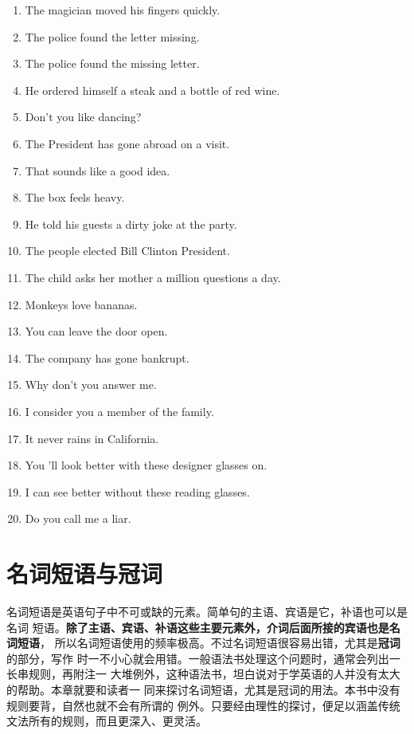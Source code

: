 \begin{enumerate}
\item The magician moved his fingers quickly.
\item The police found the letter missing.
\item The police found the missing letter.
\item He ordered himself a steak and a bottle of red wine.
\item Don't you like dancing?
\item The President has gone abroad on a visit.
\item That sounds like a good idea.
\item The box feels heavy.
\item He told his guests a dirty joke at the party.
\item The people elected Bill Clinton President.
\item The child asks her mother a million questions a day.
\item Monkeys love bananas.
\item You can leave the door open.
\item The company has gone bankrupt.
\item Why don't you answer me.
\item I consider you a member of the family.
\item It never rains in California.
\item You 'll look better with these designer glasses on.
\item I can see better without these reading glasses.
\item Do you call me a liar.
\end{enumerate}

\chapter{名词短语与冠词}

名词短语是英语句子中不可或缺的元素。简单句的主语、宾语是它，补语也可以是名词
短语。\textbf{除了主语、宾语、补语这些主要元素外，介词后面所接的宾语也是名词短语}，
所以名词短语使用的频率极高。不过名词短语很容易出错，尤其是\textbf{冠词}的部分，写作
时一不小心就会用错。一般语法书处理这个问题时，通常会列出一长串规则，再附注一
大堆例外，这种语法书，坦白说对于学英语的人并没有太大的帮助。本章就要和读者一
同来探讨名词短语，尤其是冠词的用法。本书中没有规则要背，自然也就不会有所谓的
例外。只要经由理性的探讨，便足以涵盖传统文法所有的规则，而且更深入、更灵活。

